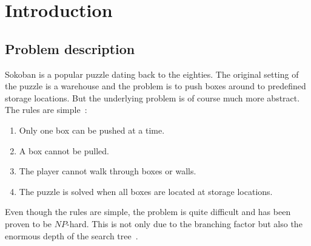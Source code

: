 \documentclass[a4paper,10pt]{article}
\begin{document}
\cleardoublepage
\tableofcontents
\newpage




\section{Introduction}

	\subsection{Problem description}
    Sokoban is a popular puzzle dating back to the eighties.  
    The original setting of the puzzle is a warehouse and the problem is to push boxes
    around to predefined storage locations.  
    But the underlying problem is of course much more abstract.  The rules are simple~\cite{wiki_soko}: 
    \begin{enumerate}[I]
        \item  Only one box can be pushed at a time.
        \item A box cannot be pulled.
        \item The player cannot walk through boxes or walls.
        \item The puzzle is solved when all boxes are located at storage locations.
    \end{enumerate}
    Even though the rules are simple, the problem is quite difficult and has been proven to be $NP$-hard.
    This is not only due to the branching factor but also the 
    enormous depth of the search tree~\cite{wiki_soko}.
    
\end{document}
